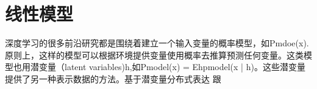 \chapter{线性模型}
\label{chap:13}

    深度学习的很多前沿研究都是围绕着建立一个输入变量的概率模型，如Pmdoe(x).原则上，这样的模型可以根据环境提供变量使用概率去推算预测任何变量。这类模型也用潜变量（latent variables)h,如Pmodel(x) = Ehpmodel(x | h)。这些潜变量提供了另一种表示数据的方法。基于潜变量分布式表达 跟